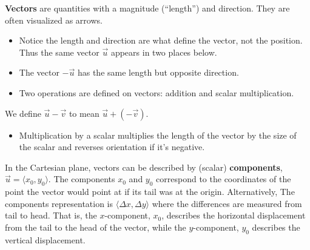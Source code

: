 \documentclass{amsbook}
\numberwithin{section}{chapter}
\numberwithin{equation}{chapter}
\newcommand{\drawgridxxyy}[4]{
	\draw[thin, color=lightgray] (#1,#3) grid (#2,#4);
	\draw[thick,->] (#1,0) -- (#2,0) node[right] {$x$}; 
	\draw[thick, ->] (0,#3) -- (0,#4) node[above] {$y$};
}
\newcommand{\qi}[1]{\begin{itemize}\item #1 \end{itemize}}
\begin{document}
\textbf{Vectors} are quantities with a magnitude (``length'') and direction. They are often visualized as arrows.
\qi{Notice the length and direction are what define the vector, not the position. Thus the same vector $\vec{u}$ appears in two places below.}
\qi{The vector $-\vec{u}$ has the same length but opposite direction.}
\qi{Two operations are defined on vectors: addition and scalar multiplication.}



We define $\vec{u}-\vec{v}$ to mean $\vec{u} + \left( -\vec{v} \right)$.

\qi{Multiplication by a scalar multiplies the length of the vector by the size of the scalar and reverses orientation if it's negative.}

In the Cartesian plane, vectors can be described by (scalar) \textbf{components}, $\vec{u} = \langle x_0, y_0 \rangle$. The components $x_0$ and $y_0$ correspond to the coordinates of the point the vector would point at if its tail was at the origin. Alternatively, The components representation is $\langle \Delta x, \Delta y \rangle$ where the differences are measured from tail to head. That is, the  $x$-component, $x_0$, describes the horizontal displacement from the tail to the head of the vector, while the $y$-component, $y_0$ describes the vertical displacement.

\end{document}
